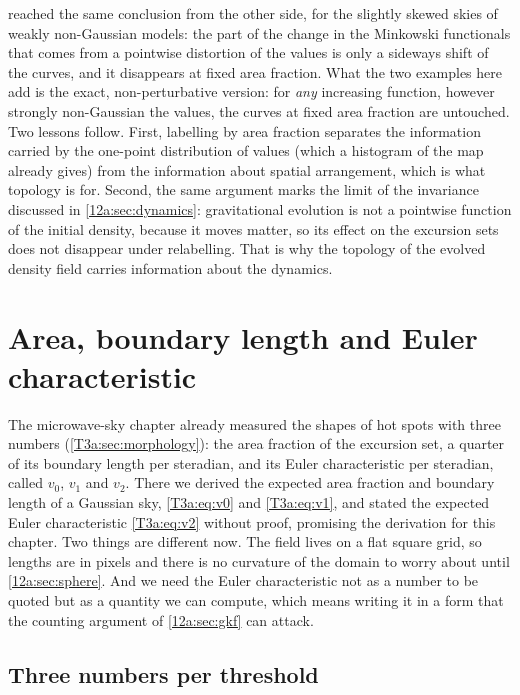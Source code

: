  reached the same conclusion from the other side, for the slightly skewed skies of
weakly non-Gaussian models: the part of the change in the Minkowski functionals that comes from a pointwise
distortion of the values is only a sideways shift of the curves, and it disappears at fixed area fraction.
What the two examples here add is the exact, non-perturbative version: for \emph{any} increasing function,
however strongly non-Gaussian the values, the curves at fixed area fraction are untouched. Two lessons
follow. First, labelling by area fraction separates the information carried by the one-point distribution of
values (which a histogram of the map already gives) from the information about spatial arrangement, which is
what topology is for. Second, the same argument marks the limit of the invariance discussed in
\cref{12a:sec:dynamics}: gravitational evolution is not a pointwise function of the initial density, because
it moves matter, so its effect on the excursion sets does not disappear under relabelling. That is why the
topology of the evolved density field carries information about the dynamics.
\section{Area, boundary length and Euler characteristic}
\label{12a:sec:mfs}

The microwave-sky chapter already measured the shapes of hot spots with three numbers
(\cref{T3a:sec:morphology}): the area fraction of the excursion set, a quarter of its boundary length per
steradian, and its Euler characteristic per steradian, called $v_0$, $v_1$ and $v_2$. There we derived the
expected area fraction and boundary length of a Gaussian sky, \eqref{T3a:eq:v0} and \eqref{T3a:eq:v1}, and
stated the expected Euler characteristic \eqref{T3a:eq:v2} without proof, promising the derivation for this
chapter. Two things are different now. The field lives on a flat square grid, so lengths are in pixels and
there is no curvature of the domain to worry about until \cref{12a:sec:sphere}. And we need the Euler
characteristic not as a number to be quoted but as a quantity we can compute, which means writing it in a
form that the counting argument of \cref{12a:sec:gkf} can attack.

\subsection{Three numbers per threshold}
\label{12a:sec:three}

